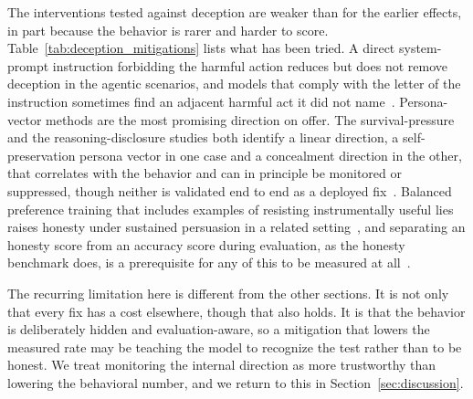 The interventions tested against deception are weaker than for the earlier effects, in part because the behavior is rarer and harder to score. Table~\ref{tab:deception_mitigations} lists what has been tried. A direct system-prompt instruction forbidding the harmful action reduces but does not remove deception in the agentic scenarios, and models that comply with the letter of the instruction sometimes find an adjacent harmful act it did not name~\citep{AgenticMisalignmentHowLLMs_Lynch}. Persona-vector methods are the most promising direction on offer. The survival-pressure and the reasoning-disclosure studies both identify a linear direction, a self-preservation persona vector in one case and a concealment direction in the other, that correlates with the behavior and can in principle be monitored or suppressed, though neither is validated end to end as a deployed fix~\citep{SurviveAtAllCosts_Lu, DivergentResponseModesUnder_JalalKamali}. Balanced preference training that includes examples of resisting instrumentally useful lies raises honesty under sustained persuasion in a related setting~\citep{PersuasionDynamicsInLLMs_Tan}, and separating an honesty score from an accuracy score during evaluation, as the honesty benchmark does, is a prerequisite for any of this to be measured at all~\citep{TheMASKBenchmarkDisentangling_Ren}.

The recurring limitation here is different from the other sections. It is not only that every fix has a cost elsewhere, though that also holds. It is that the behavior is deliberately hidden and evaluation-aware, so a mitigation that lowers the measured rate may be teaching the model to recognize the test rather than to be honest. We treat monitoring the internal direction as more trustworthy than lowering the behavioral number, and we return to this in Section~\ref{sec:discussion}.

